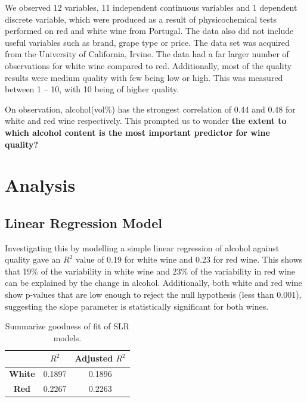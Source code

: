 \documentclass[letterpaper,11pt,twocolumn,twoside,]{pinp}
\begin{document}
We observed 12 variables, 11 independent continuous variables and 1
dependent discrete variable, which were produced as a result of
physicochemical tests performed on red and white wine from Portugal. The
data also did not include useful variables such as brand, grape type or
price. The data set was acquired from the University of California,
Irvine. The data had a far larger number of observations for white wine
compared to red. Additionally, most of the quality results were medium
quality with few being low or high. This was measured between 1 -- 10,
with 10 being of higher quality.

On observation, alcohol(vol\%) has the strongest correlation of 0.44 and
0.48 for white and red wine respectively. This prompted us to wonder
\textbf{the extent to which alcohol content is the most important
predictor for wine quality?}

\hypertarget{analysis}{%
\section{Analysis}\label{analysis}}

\hypertarget{linear-regression-model}{%
\subsection{Linear Regression Model}\label{linear-regression-model}}

Investigating this by modelling a simple linear regression of alcohol
against quality gave an \(R^{2}\) value of 0.19 for white wine and 0.23
for red wine. This shows that 19\% of the variability in white wine and
23\% of the variability in red wine can be explained by the change in
alcohol. Additionally, both white and red wine show p-values that are
low enough to reject the null hypothesis (less than 0.001), suggesting
the slope parameter is statistically significant for both wines.

\begin{table}[h]
\begin{tabular}{ ccc } 
\hline
\textbf{} & \textbf{$R^2$} & \textbf{Adjusted $R^2$} \\
\hline
\textbf{White} & 0.1897 & 0.1896 \\ 
\textbf{Red} & 0.2267 & 0.2263 \\
\hline
\end{tabular}
\centering
\caption{Summarize goodness of fit of SLR models.}
\label{table:performance_slr}
\end{table}
\end{document}
